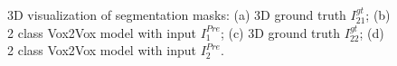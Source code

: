 \begin{figure}[!htb]
\centering
{}\hfil
{}

\hfil 
{}

\caption{3D visualization of segmentation masks: (a) 3D ground truth $I^{gt}_{21}$; (b) 2 class Vox2Vox model with input $I^{Pre}_1$; (c) 3D ground truth $I^{gt}_{22}$; (d) 2 class Vox2Vox model with input $I^{Pre}_2$.}

\label{fig:results-vox2vox-2channel}

\end{figure}

